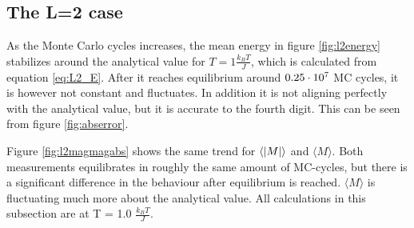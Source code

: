 



\subsection{The L=2 case}

As the Monte Carlo cycles increases, the mean energy in figure \ref{fig:l2energy} stabilizes around the analytical value for $ T = 1 \frac{k_BT}{J}$, which is calculated from equation \ref{eq:L2_E}. After it reaches equilibrium around $0.25\cdot 10^{7} $ MC cycles, it is however not constant and fluctuates. In addition it is not aligning perfectly with the analytical value, but it is accurate to the fourth digit. This can be seen from figure \ref{fig:abserror}. 

Figure \ref{fig:l2magmagabs} shows the same trend for $ \langle \abs{M} \rangle $ and $ \langle {M} \rangle $. Both measurements equilibrates in roughly the same amount of MC-cycles, but there is a significant difference in the behaviour after  equilibrium is reached. $ \langle {M} \rangle $ is fluctuating much more about the analytical value. All calculations in this subsection are at T = 1.0 $ \frac{k_BT	}{J} $. 



